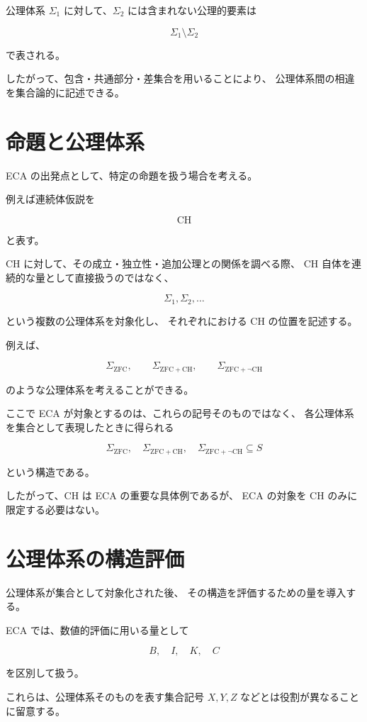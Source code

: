 \documentclass[12pt,a4paper]{article}
\begin{document}
公理体系 $\Sigma_1$ に対して、$\Sigma_2$ には含まれない公理的要素は

\[
\Sigma_1\setminus\Sigma_2
\]

で表される。

したがって、包含・共通部分・差集合を用いることにより、
公理体系間の相違を集合論的に記述できる。

\section{命題と公理体系}

ECA の出発点として、特定の命題を扱う場合を考える。

例えば連続体仮説を

\[
\mathrm{CH}
\]

と表す。

CH に対して、その成立・独立性・追加公理との関係を調べる際、
CH 自体を連続的な量として直接扱うのではなく、

\[
\Sigma_1,\Sigma_2,\ldots
\]

という複数の公理体系を対象化し、
それぞれにおける CH の位置を記述する。

例えば、

\[
\Sigma_{\mathrm{ZFC}},
\qquad
\Sigma_{\mathrm{ZFC+CH}},
\qquad
\Sigma_{\mathrm{ZFC+\neg CH}}
\]

のような公理体系を考えることができる。

ここで ECA が対象とするのは、これらの記号そのものではなく、
各公理体系を集合として表現したときに得られる

\[
\Sigma_{\mathrm{ZFC}},
\quad
\Sigma_{\mathrm{ZFC+CH}},
\quad
\Sigma_{\mathrm{ZFC+\neg CH}}
\subseteq S
\]

という構造である。

したがって、CH は ECA の重要な具体例であるが、
ECA の対象を CH のみに限定する必要はない。

\section{公理体系の構造評価}

公理体系が集合として対象化された後、
その構造を評価するための量を導入する。

ECA では、数値的評価に用いる量として

\[
B,\quad I,\quad K,\quad C
\]

を区別して扱う。

これらは、公理体系そのものを表す集合記号 $X,Y,Z$ などとは役割が異なることに留意する。
\end{document}
